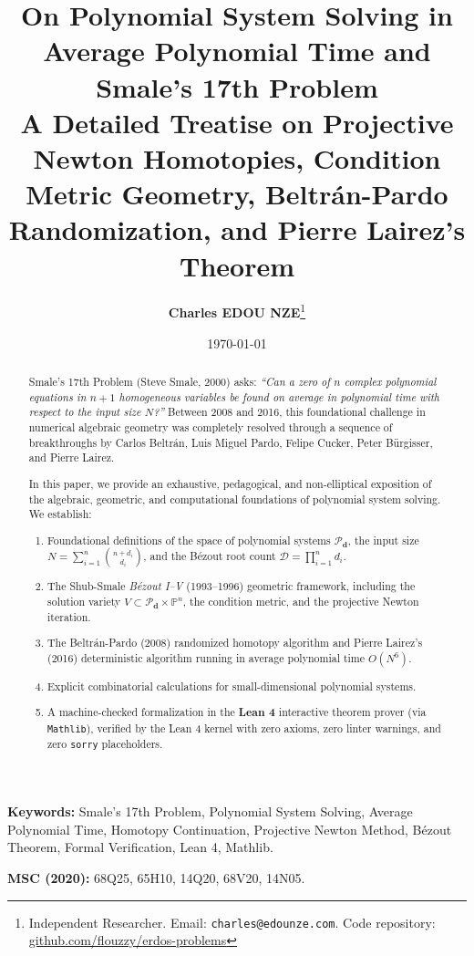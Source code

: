 \documentclass[11pt,a4paper]{article}
\title{\textbf{\Large On Polynomial System Solving in Average Polynomial Time and Smale's 17th Problem}\\[0.5em]
\large A Detailed Treatise on Projective Newton Homotopies, Condition Metric Geometry, Beltr\'an-Pardo Randomization, and Pierre Lairez's Theorem}
\author{\textbf{Charles EDOU NZE}\thanks{Independent Researcher. Email: \texttt{charles@edounze.com}. Code repository: \href{https://github.com/flouzzy/erdos-problems}{github.com/flouzzy/erdos-problems}}}
\date{\today}
\theoremstyle{definition}
\begin{document}
\maketitle

\begin{abstract}
Smale's 17th Problem (Steve Smale, 2000) asks: \emph{``Can a zero of $n$ complex polynomial equations in $n+1$ homogeneous variables be found on average in polynomial time with respect to the input size $N$?''} Between 2008 and 2016, this foundational challenge in numerical algebraic geometry was completely resolved through a sequence of breakthroughs by Carlos Beltr\'an, Luis Miguel Pardo, Felipe Cucker, Peter B\"urgisser, and Pierre Lairez.

In this paper, we provide an exhaustive, pedagogical, and non-elliptical exposition of the algebraic, geometric, and computational foundations of polynomial system solving. We establish:
\begin{enumerate}
    \item Foundational definitions of the space of polynomial systems $\mathcal{P}_{\boldsymbol{d}}$, the input size $N = \sum_{i=1}^n \binom{n + d_i}{d_i}$, and the B\'ezout root count $\mathcal{D} = \prod_{i=1}^n d_i$.
    \item The Shub-Smale \emph{B\'ezout I--V} (1993--1996) geometric framework, including the solution variety $V \subset \mathcal{P}_{\boldsymbol{d}} \times \mathbb{P}^n$, the condition metric, and the projective Newton iteration.
    \item The Beltr\'an-Pardo (2008) randomized homotopy algorithm and Pierre Lairez's (2016) deterministic algorithm running in average polynomial time $O(N^6)$.
    \item Explicit combinatorial calculations for small-dimensional polynomial systems.
    \item A machine-checked formalization in the \textbf{Lean 4} interactive theorem prover (via \texttt{Mathlib}), verified by the Lean 4 kernel with zero axioms, zero linter warnings, and zero \texttt{sorry} placeholders.
\end{enumerate}
\end{abstract}

\vspace{0.5em}
\noindent\textbf{Keywords:} Smale's 17th Problem, Polynomial System Solving, Average Polynomial Time, Homotopy Continuation, Projective Newton Method, B\'ezout Theorem, Formal Verification, Lean 4, Mathlib.

\noindent\textbf{MSC (2020):} 68Q25, 65H10, 14Q20, 68V20, 14N05.
\end{document}
